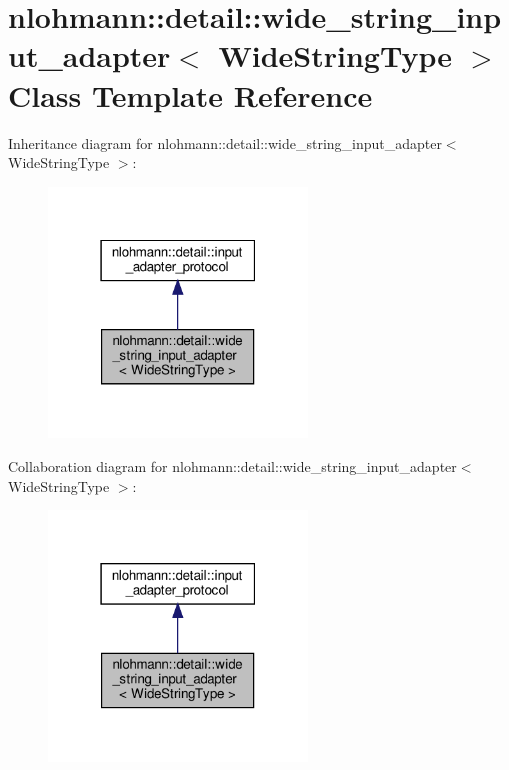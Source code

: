 \hypertarget{classnlohmann_1_1detail_1_1wide__string__input__adapter}{}\section{nlohmann\+:\+:detail\+:\+:wide\+\_\+string\+\_\+input\+\_\+adapter$<$ Wide\+String\+Type $>$ Class Template Reference}
\label{classnlohmann_1_1detail_1_1wide__string__input__adapter}


Inheritance diagram for nlohmann\+:\+:detail\+:\+:wide\+\_\+string\+\_\+input\+\_\+adapter$<$ Wide\+String\+Type $>$\+:\nopagebreak
\begin{figure}[H]
\begin{center}
\leavevmode
\includegraphics[width=195pt]{classnlohmann_1_1detail_1_1wide__string__input__adapter__inherit__graph}
\end{center}
\end{figure}


Collaboration diagram for nlohmann\+:\+:detail\+:\+:wide\+\_\+string\+\_\+input\+\_\+adapter$<$ Wide\+String\+Type $>$\+:\nopagebreak
\begin{figure}[H]
\begin{center}
\leavevmode
\includegraphics[width=195pt]{classnlohmann_1_1detail_1_1wide__string__input__adapter__coll__graph}
\end{center}
\end{figure}
